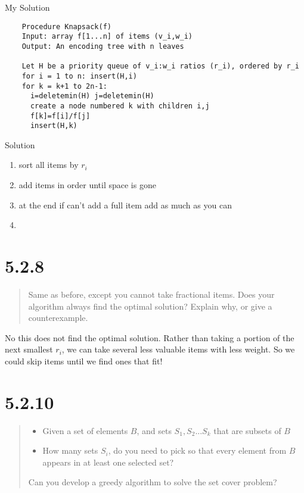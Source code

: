 \documentclass[12pt, letterpaper, twoside]{article}
\begin{document}
My Solution
\begin{lstlisting}
    Procedure Knapsack(f)
    Input: array f[1...n] of items (v_i,w_i)
    Output: An encoding tree with n leaves

    Let H be a priority queue of v_i:w_i ratios (r_i), ordered by r_i
    for i = 1 to n: insert(H,i)
    for k = k+1 to 2n-1:
      i=deletemin(H) j=deletemin(H)
      create a node numbered k with children i,j
      f[k]=f[i]/f[j]
      insert(H,k)
\end{lstlisting}

Solution
\begin{enumerate}
    \item sort all items by $r_i$
    \item add items in order until space is gone
    \item at the end if can't add a full item add as much as you can
    \item 
\end{enumerate}
\newpage
\section*{5.2.8}

\begin{quote}
    Same as before, except you cannot take fractional items.
    Does your algorithm always find the optimal solution? Explain why, or give a counterexample.
\end{quote}

No this does not find the optimal solution. Rather than taking a portion of the next smallest $r_i$,
we can take several less valuable items with less weight. So we could skip items until we find ones that fit!

\section*{5.2.10}

\begin{quote}
    \begin{itemize}
        \item Given a set of elements $B$, and sets $S_1, S_2...S_k$ that are subsets of $B$
        \item How many sets $S_i$, do you need to pick so that every element from $B$ appears in at least one selected set?
    \end{itemize}
    Can you develop a greedy algorithm to solve the set cover problem?
\end{quote}
\end{document}
